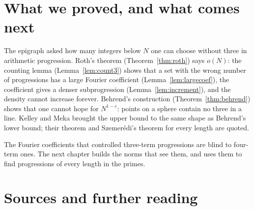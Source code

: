 \section{What we proved, and what comes next}

The epigraph asked how many integers below $N$ one can choose without three in arithmetic progression. Roth's theorem (Theorem~\ref{thm:roth}) says $o(N)$: the counting lemma (Lemma~\ref{lem:count3}) shows that a set with the wrong number of progressions has a large Fourier coefficient (Lemma~\ref{lem:largecoef}), the coefficient gives a denser subprogression (Lemma~\ref{lem:increment}), and the density cannot increase forever. Behrend's construction (Theorem~\ref{thm:behrend}) shows that one cannot hope for $N^{1-c}$: points on a sphere contain no three in a line. Kelley and Meka brought the upper bound to the same shape as Behrend's lower bound; their theorem and Szemerédi's theorem for every length are quoted.

The Fourier coefficients that controlled three-term progressions are blind to four-term ones. The next chapter builds the norms that see them, and uses them to find progressions of every length in the primes.

\section*{Sources and further reading}


